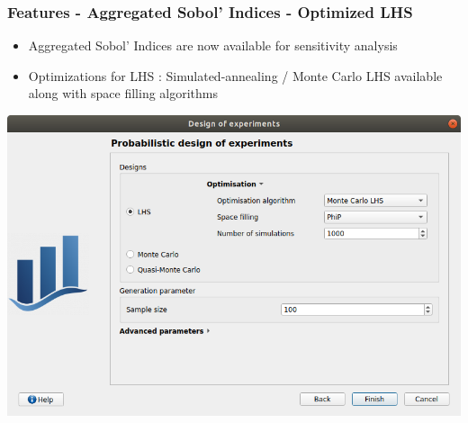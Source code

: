 \documentclass[aspectratio=169]{beamer}
\begin{document}
\begin{frame}
  \frametitle{Features - Aggregated Sobol' Indices - Optimized LHS}
  \begin{itemize}
  \item Aggregated Sobol' Indices are now available for sensitivity analysis
  \item Optimizations for LHS : Simulated-annealing / Monte Carlo LHS available along with space filling algorithms
  \end{itemize}
  \begin{center}
    \includegraphics[height=0.6\textheight]{figures/LHS.png}
  \end{center}
\end{frame}

\end{document}
